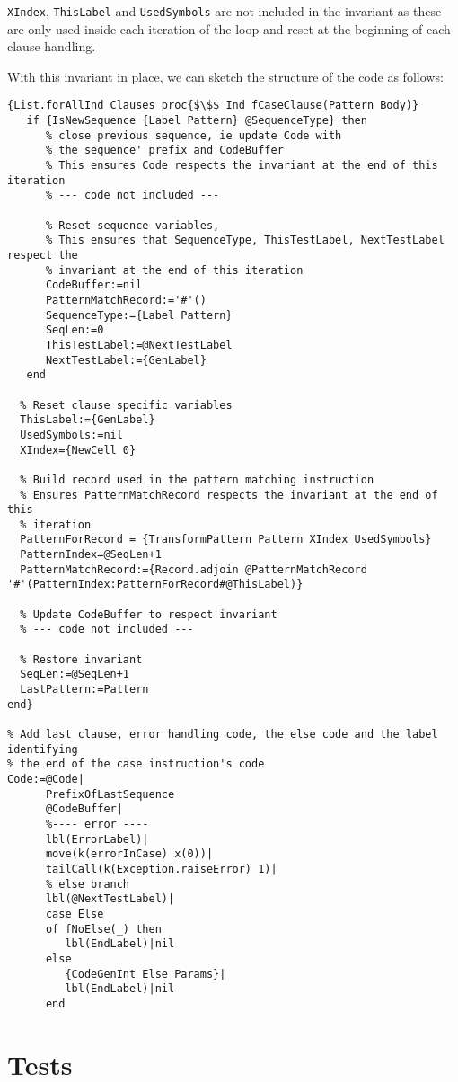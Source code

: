 \documentclass[a4paper]{memoir}
\begin{document}
\lstinline!XIndex!, \lstinline!ThisLabel! and \lstinline!UsedSymbols! are not
included in the invariant as these are only used inside
each iteration of the loop and reset at the beginning of each clause handling.

With this invariant in place, we can sketch the structure of the code as
follows:
\begin{lstlisting}[mathescape]
{List.forAllInd Clauses proc{$\$$ Ind fCaseClause(Pattern Body)}
   if {IsNewSequence {Label Pattern} @SequenceType} then
      % close previous sequence, ie update Code with
      % the sequence' prefix and CodeBuffer
      % This ensures Code respects the invariant at the end of this iteration
      % --- code not included ---

      % Reset sequence variables, 
      % This ensures that SequenceType, ThisTestLabel, NextTestLabel respect the 
      % invariant at the end of this iteration
      CodeBuffer:=nil
      PatternMatchRecord:='#'()
      SequenceType:={Label Pattern}
      SeqLen:=0
      ThisTestLabel:=@NextTestLabel
      NextTestLabel:={GenLabel}
   end

  % Reset clause specific variables 
  ThisLabel:={GenLabel}
  UsedSymbols:=nil
  XIndex={NewCell 0}

  % Build record used in the pattern matching instruction
  % Ensures PatternMatchRecord respects the invariant at the end of this
  % iteration
  PatternForRecord = {TransformPattern Pattern XIndex UsedSymbols}
  PatternIndex=@SeqLen+1
  PatternMatchRecord:={Record.adjoin @PatternMatchRecord '#'(PatternIndex:PatternForRecord#@ThisLabel)}

  % Update CodeBuffer to respect invariant
  % --- code not included ---

  % Restore invariant
  SeqLen:=@SeqLen+1
  LastPattern:=Pattern
end}

% Add last clause, error handling code, the else code and the label identifying
% the end of the case instruction's code
Code:=@Code|
      PrefixOfLastSequence
      @CodeBuffer|
      %---- error ----
      lbl(ErrorLabel)|
      move(k(errorInCase) x(0))|
      tailCall(k(Exception.raiseError) 1)|
      % else branch
      lbl(@NextTestLabel)|
      case Else
      of fNoElse(_) then
         lbl(EndLabel)|nil
      else
         {CodeGenInt Else Params}|
         lbl(EndLabel)|nil
      end
\end{lstlisting}


\section{Tests}
\end{document}

